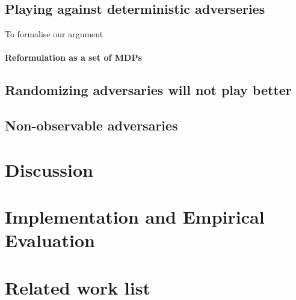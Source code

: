 \documentclass[conference]{IEEEtran}
\theoremstyle{remark}
\begin{document}
\subsection{Playing against deterministic adverseries}
To formalise our argument
\paragraph{Reformulation as a set of MDPs}

\paragraph{}


\subsection{Randomizing adversaries will not play better}

\subsection{Non-observable adversaries}

\section{Discussion}


\section{Implementation and Empirical Evaluation}

\section{Related work list}
\cite{DBLP:journals/corr/abs-2009-10883}
\cite{}





\end{document}

